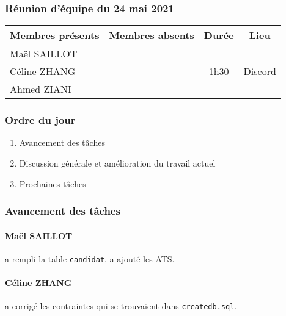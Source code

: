 


% 
\subsubsection*{\large{Réunion d'équipe du 24 mai 2021}}
\begin{center}
\begin{tabular}{| l | l || c | c |}
    \hline
    Membres présents & Membres absents & Durée & Lieu \\
    \hline
    Maël SAILLOT & & & \\ Céline ZHANG & & 1h30 & Discord \\ Ahmed ZIANI & & & \\
    \hline
\end{tabular}
\end{center}

\subsubsection*{Ordre du jour}
\begin{enumerate}
    \item Avancement des tâches
    \item Discussion générale et amélioration du travail actuel
    \item Prochaines tâches
\end{enumerate}

\subsubsection*{Avancement des tâches}
\paragraph{Maël SAILLOT} a rempli la table \texttt{candidat}, a ajouté les ATS.
\paragraph{Céline ZHANG} a corrigé les contraintes qui se trouvaient dans \texttt{createdb.sql}.
